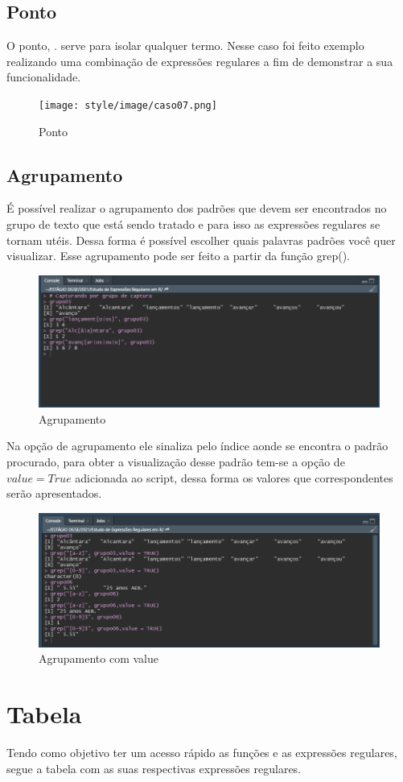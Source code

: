 \documentclass[a4paper]{article}
\begin{document}
\subsection{Ponto}
O ponto, $.$ serve para isolar qualquer termo. Nesse caso foi feito exemplo realizando uma combinação de expressões regulares a fim de demonstrar a sua funcionalidade.
\begin{figure}[htb!]
    \centering
    \texttt{[image: style/image/caso07.png]}
    \caption{Ponto}
    \label{fig:Ponto}
\end{figure}
\subsection{Agrupamento}
É possível realizar o agrupamento dos padrões que devem ser encontrados no grupo de texto que está sendo tratado e para isso as expressões regulares se tornam utéis. Dessa forma é possível escolher quais palavras padrões você quer visualizar. Esse agrupamento pode ser feito a partir da função grep().
\begin{figure}[htb!]
    \centering
    \includegraphics[width=0.7\linewidth]{style/image/caso10.png}
    \caption{Agrupamento}
    \label{fig:grep}
\end{figure}
Na opção de agrupamento ele sinaliza pelo índice aonde se encontra o padrão procurado, para obter a visualização desse padrão tem-se a opção de $value = True$ adicionada ao script, dessa forma os valores que correspondentes serão apresentados.
\begin{figure}[htb!]
    \centering
    \includegraphics[width=0.7\linewidth]{style/image/caso11.png}
    \caption{Agrupamento com value}
    \label{fig:grepwithvalue}
\end{figure}
\section{Tabela}
Tendo como objetivo ter um acesso rápido as funções e as expressões regulares, segue a tabela com as suas respectivas expressões regulares.
\end{document}
